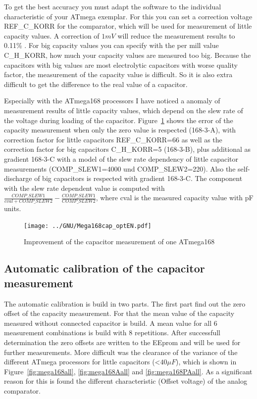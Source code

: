 To get the best accuracy you must adapt the software to the individual characteristic of your ATmega exemplar.
For this you can set a correction voltage REF\_C\_KORR for the comparator, which will be used for measurement of little capacity values.
A correction of \(1mV\) will reduce the measurement results to 0.11\% .
For big capacity values you can specify with the per mill value C\_H\_KORR, how much your capacity values are measured too big.
Because the capacitors with big values are most electrolytic capacitors with worse quality factor, the measurement of
the capacity value is difficult. So it is also extra difficult to get the difference to the real value of a capacitor.

Especially with the ATmega168 processors I have noticed a anomaly of measurement results of little capacity values,
which depend on the slew rate of the voltage during loading of the capacitor.
Figure~\ref{fig:mega168optcap} shows the error of the capacity measurement when only the zero value is respected
(168-3-A), with correction factor for little capacitors REF\_C\_KORR=66 as well as the correction factor for big
capacitors C\_H\_KORR=5 (168-3-B), plus additional as gradient 168-3-C  with a model of the slew rate dependency of little capacitor 
measurements (COMP\_SLEW1=4000 und COMP\_SLEW2=220). Also the self-discharge of big capacitors is respected with gradient 168-3-C.
The component with the slew rate dependent value is computed with \(\frac{COMP\_SLEW1}{cval+COMP\_SLEW2} - \frac{COMP\_SLEW1}{COMP\_SLEW2}\),
where cval is the measured capacity value with pF units.

\begin{figure}[H]
\centering
\texttt{[image: ../GNU/Mega168cap\_optEN.pdf]}
\caption{Improvement of the capacitor measurement of one ATmega168}
\label{fig:mega168optcap}
\end{figure}

\subsection{Automatic calibration of the capacitor measurement}

The automatic calibration is build in two parts. The first part find out the zero offset of the capacity measurement.
For that the mean value of the capacity measured without connected capacitor is build. 
A mean value for all 6 measurement combinations is build with 8 repetitions.
After successfull determination the zero offsets are written to the EEprom and will be used for further measurements.
More difficult was the clearance of the variance of the different ATmega processors for little capacitors (\textless \(40 \mu F\)),
which is shown in Figure~\ref{fig:mega168all}, \ref{fig:mega168Aall} and \ref{fig:mega168PAall}.
As a significant reason for this is found the different characteristic (Offset voltage) of the analog comparator.

